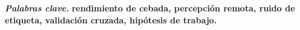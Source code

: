\documentclass[conference,letterpaper]{IEEEtran}
\begin{document}
\smallskip
\noindent\textbf{\textit{Palabras clave.}} \bfseries rendimiento de cebada, percepción remota, ruido de etiqueta,
validación cruzada, hipótesis de trabajo.\par\mdseries














\end{document}
